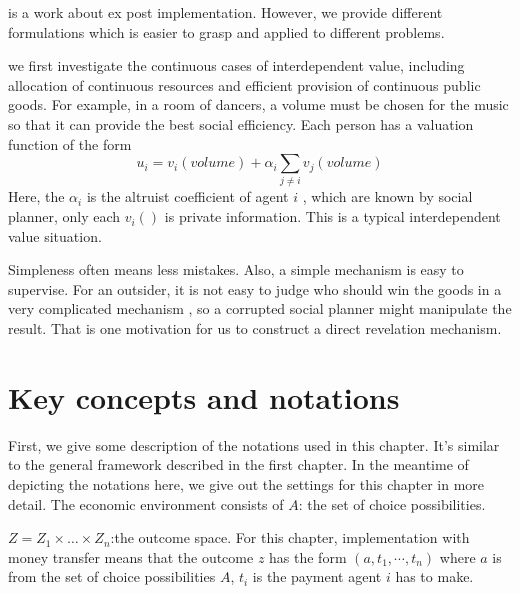  \parencite{Ely2006} is a work about ex post implementation. However, we provide different formulations which is easier to grasp and applied to different problems.
 
 we first investigate the continuous
 cases of interdependent value,  including allocation of continuous resources and efficient provision of continuous public goods. 
 For example, in a room of dancers, a volume must be chosen for the music so that it can provide the best social efficiency. Each person
 has a valuation function of the form 
 $$u_i= v_i(volume) + \alpha_i\sum_{j\neq i}v_j(volume)$$
 Here, the $\alpha_i$ is the altruist coefficient of agent $i$ , which are known by social planner, only each $v_i()$ is private information. This is a typical interdependent value situation.

 
 


 
Simpleness often means less mistakes. Also, a simple mechanism is  easy to supervise. For an outsider, it is not easy to judge who should win the goods in a very complicated mechanism
, so a corrupted social planner might manipulate the result. That is one motivation for us to construct a direct revelation mechanism.





\section{Key concepts and notations}
First, we give some description of the notations used in this chapter. It's similar to the general framework described in the first chapter. In the meantime of depicting the notations here, we give out the settings for this 
chapter in more detail.
The economic environment consists of
$A$: the set of choice possibilities.

$Z=Z_1\times \dots\times Z_n$:the outcome space. For this chapter, implementation with money transfer means that the 
outcome $z$ has the form $(a, t_1,\cdots,t_n)$ where $a$ is from the set of choice possibilities $A$, $t_i$ is 
the payment agent $i$ has to make.

